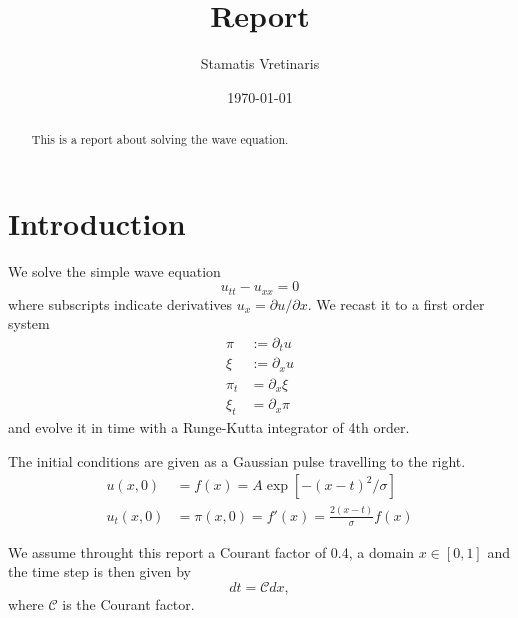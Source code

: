 \documentclass[reprint, prd, nofootinbib, superscriptaddress, floatfix]{revtex4-2}  %
\begin{document}
\title{Report}

\author{Stamatis Vretinaris}


\date{\today}

\begin{abstract}
This is a report about solving the wave equation.
\end{abstract}

\maketitle
\section{Introduction}
We solve the simple wave equation
\begin{equation}
  \label{eq:wave-equation}
  u_{tt} - u_{xx} = 0
\end{equation}
where subscripts indicate derivatives $u_x = \partial u /\partial x$. We recast it to a first order system
\begin{align}
  \label{eq:1st-order-system}
  \pi &:= \partial_t u \nonumber \\
  \xi &:= \partial_x u \\
  \pi_t &= \partial_x \xi \nonumber\\
  \xi_t &= \partial_x \pi \nonumber
\end{align}
and evolve it in time with a Runge-Kutta integrator of 4th order.

The initial conditions are given as a Gaussian pulse travelling to the right.
\begin{align}
  \label{eq:initial-conditions}
  u(x,0) &= f(x) = A \exp[-(x-t)^2/\sigma] \\
  u_t(x,0) &= \pi(x,0) = f'(x) = \frac{2 (x-t)}{\sigma} f(x)
\end{align}

We assume throught this report a Courant factor of 0.4, a domain $x\in[0,1]$ and the time step is then given by
\begin{equation}
  \label{eq:timestep}
  dt = \mathcal{C} dx,
\end{equation}
where $\mathcal{C}$ is the Courant factor.
\end{document}
